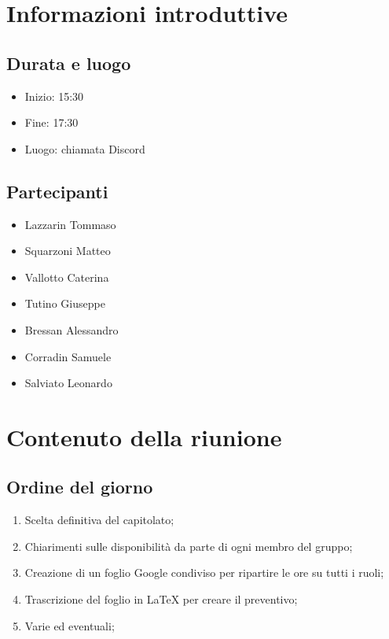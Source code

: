 \documentclass[10pt]{article}
\begin{document}
\newpage
\tableofcontents{\newpage}

\section{Informazioni introduttive}
\subsection{Durata e luogo}
\begin{itemize}
  \item Inizio: 15:30
  \item Fine: 17:30
  \item Luogo: chiamata Discord
\end{itemize}
\subsection{Partecipanti}
\begin{itemize}
  \item Lazzarin Tommaso
  \item Squarzoni Matteo
  \item Vallotto Caterina
  \item Tutino Giuseppe
  \item Bressan Alessandro
  \item Corradin Samuele
  \item Salviato Leonardo
\end{itemize}

\section{Contenuto della riunione}
\subsection{Ordine del giorno}
\begin{enumerate}
  \item Scelta definitiva del capitolato;
  \item Chiarimenti sulle disponibilità da parte di ogni membro del gruppo;
  \item Creazione di un foglio Google condiviso per ripartire le ore su tutti i ruoli;
  \item Trascrizione del foglio in LaTeX per creare il preventivo;
  \item Varie ed eventuali;
\end{enumerate}
\end{document}
